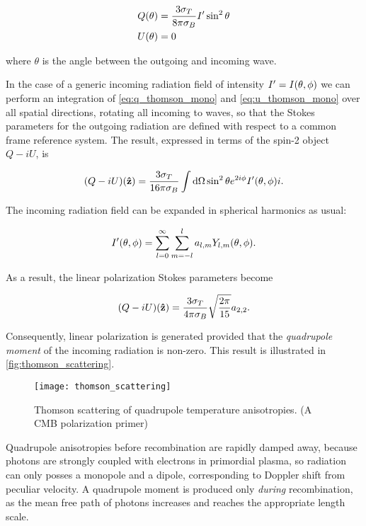 \begin{align}
        Q\qty(\theta) & = \frac{3\sigma_T}{8\pi\sigma_B}I'\sin^2\theta
        \label{eq:q_thomson_mono} \\
        U\qty(\theta) & = 0 \label{eq:u_thomson_mono}
\end{align}

where $\theta$ is the angle between the outgoing and incoming wave.

In the case of a generic incoming radiation field of intensity $I' =
I\qty(\theta,\phi)$ we can perform an integration of
\autoref{eq:q_thomson_mono} and \autoref{eq:u_thomson_mono} over all
spatial directions, rotating all incoming to waves, so that the Stokes
parameters for the outgoing radiation are defined with respect to a common
frame reference system. The result, expressed in terms of the spin-2 object
$Q - iU$, is

\begin{equation}
        (Q -iU)\qty(\vectorunit{z}) = \frac{3\sigma_T}{16\pi \sigma_B}
        \int \dd{\Omega} \sin^2\theta e^{2i\phi}I'\qty(\theta,\phi)i.
\end{equation}

The incoming radiation field can be expanded in spherical harmonics as
usual:

\begin{equation}
        I'\qty(\theta,\phi) = \sum^\infty_{l = 0}\sum^l_{m = -l}
        a_{l,m} Y_{l,m}\qty(\theta,\phi).
\end{equation}

As a result, the linear polarization Stokes parameters become

\begin{equation}
        (Q - iU)\qty(\vectorunit{z}) = \frac{3\sigma_T}{4\pi\sigma_B}
        \sqrt{\frac{2\pi}{15}} a_{2,2}.
\end{equation}

Consequently, linear polarization is generated provided that the \emph{quadrupole
moment} of the incoming radiation is non-zero. This result is illustrated
in \autoref{fig:thomson_scattering}.

\begin{figure}
        \centering
        \texttt{[image: thomson\_scattering]}
        \caption{Thomson scattering of quadrupole temperature anisotropies.
        (A CMB polarization primer)}
        \label{fig:thomson_scattering}
\end{figure}

Quadrupole anisotropies before recombination are rapidly damped away,
because photons are strongly coupled with electrons in primordial plasma, so
radiation can only posses a monopole and a dipole, corresponding to Doppler
shift from peculiar velocity. A quadrupole moment is produced only
\emph{during} recombination, as the mean free path of photons increases and
reaches the appropriate length scale.

